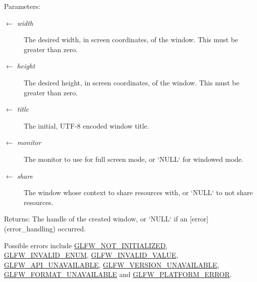 \begin{Desc}
\item[Parameters:]
\begin{description}
\item[\mbox{$\leftarrow$} {\em width}]The desired width, in screen coordinates, of the window. This must be greater than zero. \item[\mbox{$\leftarrow$} {\em height}]The desired height, in screen coordinates, of the window. This must be greater than zero. \item[\mbox{$\leftarrow$} {\em title}]The initial, UTF-8 encoded window title. \item[\mbox{$\leftarrow$} {\em monitor}]The monitor to use for full screen mode, or `NULL` for windowed mode. \item[\mbox{$\leftarrow$} {\em share}]The window whose context to share resources with, or `NULL` to not share resources. \end{description}
\end{Desc}
\begin{Desc}
\item[Returns:]The handle of the created window, or `NULL` if an \mbox{[}error\mbox{]}(error\_\-handling) occurred.\end{Desc}
Possible errors include \hyperlink{group__errors_g2374ee02c177f12e1fa76ff3ed15e14a}{GLFW\_\-NOT\_\-INITIALIZED}, \hyperlink{group__errors_g76f6bb9c4eea73db675f096b404593ce}{GLFW\_\-INVALID\_\-ENUM}, \hyperlink{group__errors_gaf2ef9aa8202c2b82ac2d921e554c687}{GLFW\_\-INVALID\_\-VALUE}, \hyperlink{group__errors_g56882b290db23261cc6c053c40c2d08e}{GLFW\_\-API\_\-UNAVAILABLE}, \hyperlink{group__errors_gd16c5565b4a69f9c2a9ac2c0dbc89462}{GLFW\_\-VERSION\_\-UNAVAILABLE}, \hyperlink{group__errors_g196e125ef261d94184e2b55c05762f14}{GLFW\_\-FORMAT\_\-UNAVAILABLE} and \hyperlink{group__errors_gd44162d78100ea5e87cdd38426b8c7a1}{GLFW\_\-PLATFORM\_\-ERROR}.

